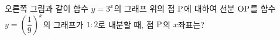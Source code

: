 \noindent\begin{minipage}[t]{0.58\linewidth}\vspace{0pt}\raggedright 오른쪽 그림과 같이 함수 $y=3^{x}$의 그래프 위의 점 $\mathrm{P}$에 대하여 선분 $\mathrm{OP}$를 함수 $y=\left(\dfrac{1}{9}\right)^{x}$의 그래프가 $1:2$로 내분할 때, 점 $\mathrm{P}$의 $x$좌표는? \end{minipage}\hfill\begin{minipage}[t]{0.4\linewidth}\vspace{0pt}\centering \resizebox{\ifdim\width>\linewidth\linewidth\else\width\fi}{!}{}\end{minipage}\par
{}
